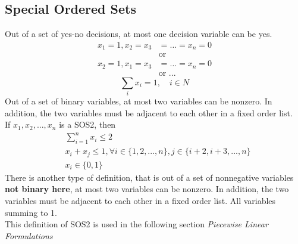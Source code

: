 \documentclass[10pt]{book}
\begin{document}
				\subsection{Special Ordered Sets}
					 Out of a set of yes-no decisions, at most one decision variable can be yes. \
					\begin{align}
						x_1=1,x_2=x_3&=\dots=x_n=0 \nonumber \\
						&\text{or} \nonumber \\
						x_2=1, x_1=x_3&=\dots=x_n=0 \nonumber \\
						&\text{or ...} \nonumber
					\end{align} 
					\begin{equation} \sum_{i} x_i = 1, \quad i \in N\nonumber \end{equation}
					 Out of a set of binary variables, at most two variables can be nonzero. In addition, the two variables must be adjacent to each other in a fixed order list.\\
					\framebox{\textbf{Modeling:}}
					If $x_1, x_2, ... , x_n$ is a SOS2, then
					\begin{align}
						& \sum_{i=1}^{n} x_i \le 2 \nonumber \\
						& x_i + x_j \le 1, \forall i \in \{1, 2,..., n\}, j \in \{i+2, i+3, ..., n\} \nonumber \\
						&x_i \in \{0, 1\}\nonumber
					\end{align}
					 There is another type of definition, that is out of a set of nonnegative variables \textbf{not binary here}, at most two variables can be nonzero. In addition, the two variables must be adjacent to each other in a fixed order list. All variables summing to 1.\\
					This definition of SOS2 is used in the following section \textit{Piecewise Linear Formulations}\\
									
\end{document}
